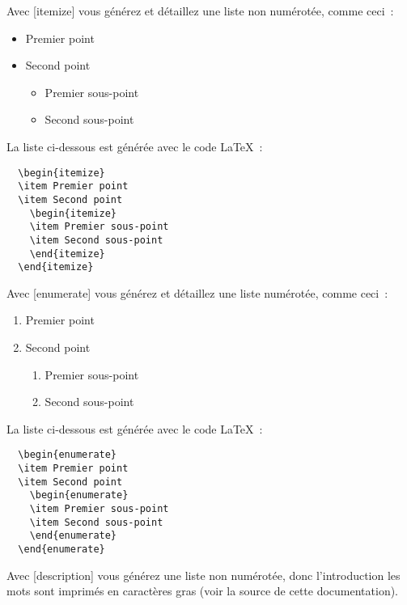 \begin{description}
\item Avec [itemize] vous générez et détaillez une liste non numérotée, comme ceci~:
  \begin{itemize}
  \item Premier point
  \item Second point
    \begin{itemize}
    \item Premier sous-point
    \item Second sous-point
    \end{itemize}
  \end{itemize}

La liste ci-dessous est générée avec le code \LaTeX~:
\begin{verbatim}
  \begin{itemize}
  \item Premier point
  \item Second point
    \begin{itemize}
    \item Premier sous-point
    \item Second sous-point
    \end{itemize}
  \end{itemize}
\end{verbatim}

\item Avec [enumerate] vous générez et détaillez une liste numérotée, comme ceci~:
  \begin{enumerate}
  \item Premier point
  \item Second point
    \begin{enumerate}
    \item Premier sous-point
    \item Second sous-point
    \end{enumerate}
  \end{enumerate}

La liste ci-dessous est générée avec le code \LaTeX~:
\begin{verbatim}
  \begin{enumerate}
  \item Premier point
  \item Second point
    \begin{enumerate}
    \item Premier sous-point
    \item Second sous-point
    \end{enumerate}
  \end{enumerate}
\end{verbatim}

\item Avec [description] vous générez une liste non numérotée, donc 
  l'introduction les mots sont imprimés en caractères gras (voir la source
  de cette documentation).
\end{description}



